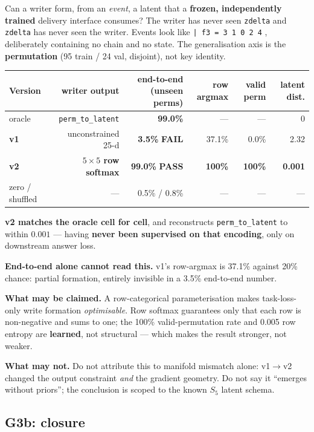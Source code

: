 \documentclass[11pt, a4paper]{article}
\newcommand{\PASS}{\textcolor{green!45!black}{\textbf{PASS}}}
\newcommand{\FAIL}{\textcolor{red!70!black}{\textbf{FAIL}}}
\begin{document}
Can a writer form, from an \emph{event}, a latent that a \textbf{frozen, independently
trained} delivery interface consumes? The writer has never seen \verb|zdelta| and
\verb|zdelta| has never seen the writer. Events look like \verb :| f3 = 3 1 0 2 4: ,
deliberately containing no chain and no state. The generalisation axis is the
\textbf{permutation} (95 train / 24 val, disjoint), not key identity.

\begin{table}[h]
\centering\small
\begin{tabular}{lrrrrr}
\toprule
Version & writer output & end-to-end (unseen perms) & row argmax & valid perm & latent dist. \\
\midrule
oracle & \verb|perm_to_latent| & \textbf{99.0\%} & --- & --- & 0 \\
\textbf{v1} & unconstrained 25-d & \textbf{3.5\%} \FAIL{} & 37.1\% & 0.0\% & 2.32 \\
\textbf{v2} & \textbf{$5\times5$ row softmax} & \textbf{99.0\%} \PASS{} & \textbf{100\%}
  & \textbf{100\%} & \textbf{0.001} \\
zero / shuffled & --- & 0.5\% / 0.8\% & --- & --- & --- \\
\bottomrule
\end{tabular}
\end{table}

\textbf{v2 matches the oracle cell for cell}, and reconstructs \verb|perm_to_latent| to
within $0.001$ --- having \textbf{never been supervised on that encoding}, only on
downstream answer loss.

\textbf{End-to-end alone cannot read this.} v1's row-argmax is 37.1\% against 20\%
chance: partial formation, entirely invisible in a 3.5\% end-to-end number.

\textbf{What may be claimed.} A row-categorical parameterisation makes task-loss-only
write formation \emph{optimisable}. Row softmax guarantees only that each row is
non-negative and sums to one; the 100\% valid-permutation rate and 0.005 row entropy are
\textbf{learned}, not structural --- which makes the result stronger, not weaker.

\textbf{What may not.} Do not attribute this to manifold mismatch alone: v1$\to$v2
changed the output constraint \emph{and} the gradient geometry. Do not say it ``emerges
without priors''; the conclusion is scoped to the known $S_5$ latent schema.

\subsection{G3b: closure}
\end{document}
